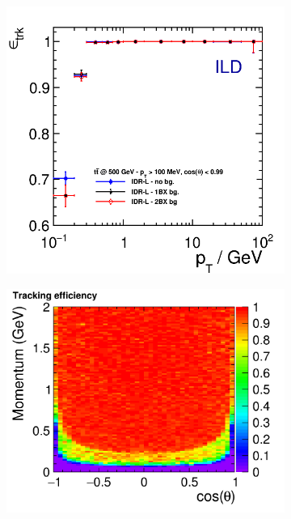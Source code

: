 \begin{figure}[htbp]
\begin{subfigure}{0.49\hsize}
 \caption{ \label{fig:perf:trkeff_th}}
 \end{subfigure}
\begin{subfigure}{0.49\hsize} 
 \includegraphics[width=\hsize]{Performance/fig/trkEff_pt_ttbar_pairBG_IDR.png}
 \caption{  \label{fig:perf:trkeff_bg}}
 \end{subfigure}
\begin{subfigure}{0.49\hsize} 
 \includegraphics[width=\hsize]{Performance/fig/newSiliconTracking_10kEvents_effTrk_Momentum_v2.png}

\end{subfigure}
\end{figure}
